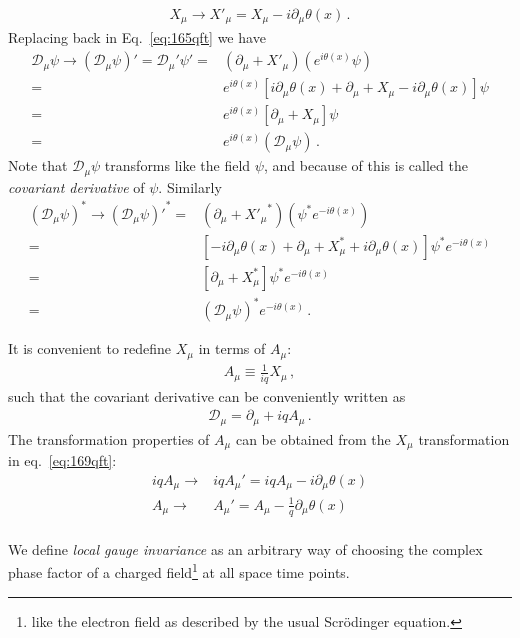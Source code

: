 \begin{align}
\label{eq:169qft}
X_\mu\to  X'_\mu=X_\mu-i\partial_\mu\theta(x)\,.
\end{align}
Replacing back in Eq.~\eqref{eq:165qft} we have
\begin{align}
    \mathcal{D}_\mu \psi\to\left(\mathcal{D}_\mu \psi\right)'=\mathcal{D}_\mu' \psi'=&(\partial_\mu+X'_\mu) \left(e^{i\theta(x)}\psi\right)\nonumber\\
=&e^{i\theta(x)}\left[i\partial_\mu \theta(x)+\partial_\mu+X_\mu-i\partial_\mu\theta(x) \right]\psi\nonumber\\
=&e^{i\theta(x)}\left[\partial_\mu+X_\mu\right]\psi\nonumber\\
=&e^{i\theta(x)}\left(\mathcal{D}_\mu\psi\right)\,.
\end{align}
Note that $\mathcal{D}_\mu\psi$ transforms like the field $\psi$, and because of this is called the \emph{covariant derivative} of $\psi$.
Similarly
\begin{align}
    (\mathcal{D}_\mu \psi)^*\to{\left(\mathcal{D}_\mu \psi\right)'}^*=&(\partial_\mu+{X'_\mu}^*) \left(\psi^*e^{-i\theta(x)}\right)\nonumber\\
=&\left[-i\partial_\mu \theta(x)+\partial_\mu+X_\mu^*+i\partial_\mu\theta(x) \right]\psi^*e^{-i\theta(x)}\nonumber\\
=&\left[\partial_\mu+X_\mu^*\right]\psi^*e^{-i\theta(x)}\nonumber\\
=&\left(\mathcal{D}_\mu\psi\right)^*e^{-i\theta(x)}\,.
\end{align}

It is convenient to redefine $X_\mu$ in terms of $A_\mu$:
\begin{align}
  A_\mu\equiv\frac{1}{i q}X_\mu\,,
\end{align}
such that the covariant derivative can be conveniently written as
\begin{align}
\label{eq:170qft}
  \mathcal{D}_\mu=\partial_\mu+i q A_\mu\,.
\end{align}
The transformation properties of $A_\mu$ can be obtained from the $X_\mu$ transformation in eq.~\eqref{eq:169qft}: 
\begin{align}
 i q A_\mu\to& i q A_\mu'=i q A_\mu-i \partial_\mu\theta(x)\nonumber\\
  A_\mu\to&  A_\mu'= A_\mu-\frac{1}{q} \partial_\mu\theta(x)\nonumber\\
\end{align}


We define \emph{local gauge invariance} as an arbitrary way of choosing the complex phase factor of a charged field\footnote{like the electron field as described by the usual Scrödinger equation.} at all space time points.

